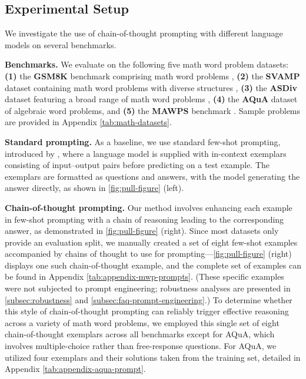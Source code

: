 \subsection{Experimental Setup}

We investigate the use of chain-of-thought prompting with different language models on several benchmarks.

\textbf{Benchmarks.}
We evaluate on the following five math word problem datasets:
\textbf{(1)} the \textbf{GSM8K} benchmark comprising math word problems \citep{cobbe2021training}, 
\textbf{(2)} the \textbf{SVAMP} dataset containing math word problems with diverse structures \citep{patel-etal-2021-nlp},
\textbf{(3)} the \textbf{ASDiv} dataset featuring a broad range of math word problems \citep{miao-etal-2020-diverse},
\textbf{(4)} the \textbf{AQuA} dataset of algebraic word problems, and
\textbf{(5)} the \textbf{MAWPS} benchmark \citep{koncel-kedziorski-etal-2016-mawps}. Sample problems are provided in Appendix \cref{tab:math-datasets}.

\textbf{Standard prompting.} As a baseline, we use standard few-shot prompting, introduced by \citet{brown2020language}, where a language model is supplied with in-context exemplars consisting of input--output pairs before predicting on a test example. The exemplars are formatted as questions and answers, with the model generating the answer directly, as shown in \cref{fig:pull-figure} (left).

\textbf{Chain-of-thought prompting.} Our method involves enhancing each example in few-shot prompting with a chain of reasoning leading to the corresponding answer, as demonstrated in \cref{fig:pull-figure} (right). Since most datasets only provide an evaluation split, we manually created a set of eight few-shot examples accompanied by chains of thought to use for prompting—\cref{fig:pull-figure} (right) displays one such chain-of-thought example, and the complete set of examples can be found in Appendix \cref{tab:appendix-mwp-prompts}. (These specific examples were not subjected to prompt engineering; robustness analyses are presented in \cref{subsec:robustness} and \cref{subsec:faq-prompt-engineering}.) To determine whether this style of chain-of-thought prompting can reliably trigger effective reasoning across a variety of math word problems, we employed this single set of eight chain-of-thought exemplars across all benchmarks except for AQuA, which involves multiple-choice rather than free-response questions. For AQuA, we utilized four exemplars and their solutions taken from the training set, detailed in Appendix \cref{tab:appendix-aqua-prompt}.

